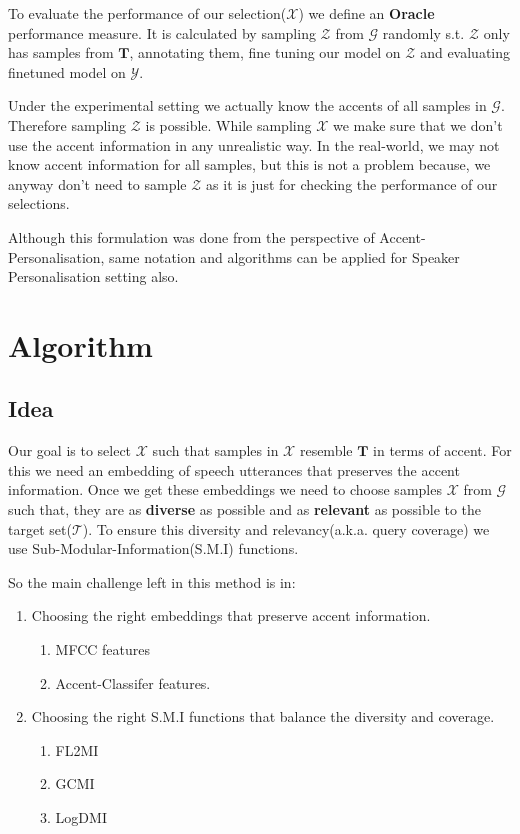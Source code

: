 \documentclass[12pt, a4paper, twoside]{article}
\begin{document}
\vspace{5pt}
To evaluate the performance of our selection($\mathcal{X}$) we define an \textbf{Oracle} performance measure.
It is calculated by sampling $\mathcal{Z}$ from $\mathcal{G}$ randomly s.t. $\mathcal{Z}$ only has samples from $\mathbf{T}$,
annotating them, fine tuning our model on $\mathcal{Z}$ and evaluating finetuned model on $\mathcal{Y}$. 

\vspace{5pt}
Under the experimental setting we actually know the accents of all samples in $\mathcal{G}$. Therefore sampling $\mathcal{Z}$ is
possible. While sampling $\mathcal{X}$ we make sure that we don't use the accent information in any unrealistic way. In the real-world, we may not know accent information for all samples, but this is not a problem
because, we anyway don't need to sample $\mathcal{Z}$ as it is just for checking the performance of our selections. 

\vspace{5pt}
Although this formulation was done from the perspective of Accent-Personalisation, same notation and algorithms
can be applied for Speaker Personalisation setting also.
\clearpage

\section{Algorithm}
\subsection{Idea}
Our goal is to select $\mathcal{X}$ such that samples in $\mathcal{X}$ resemble $\mathbf{T}$ in terms of accent. For this we need an
embedding of speech utterances that preserves the accent information. Once we get these embeddings we need to choose samples $\mathcal{X}$ from $\mathcal{G}$
such that, they are as \textbf{diverse} as possible and as \textbf{relevant} as possible to the target set($\mathcal{T}$). To ensure this
diversity and relevancy(a.k.a. query coverage) we use Sub-Modular-Information(S.M.I) functions.

\vspace{3pt}
So the main challenge left in this method is in:
\vspace{-6pt}
\begin{enumerate}
    \item Choosing the right embeddings that preserve accent information.
          \begin{enumerate}
              \item MFCC features
              \item Accent-Classifer features.
          \end{enumerate}
    \item Choosing the right S.M.I functions that balance the diversity and coverage.
          \begin{enumerate}
              \item FL2MI
              \item GCMI
              \item LogDMI
          \end{enumerate}
\end{enumerate}
\end{document}
